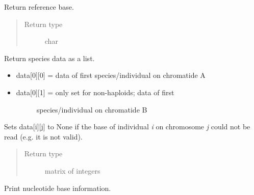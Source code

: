 \documentclass[letterpaper,10pt,english]{sphinxmanual}
\begin{document}
\begin{fulllineitems}
\begin{fulllineitems}
\label{vcf:libPoMo.vcf.NucBase.get_ref_base}
Return reference base.
\begin{quote}\begin{description}
\item[{Return type}] \leavevmode
char

\end{description}\end{quote}

\end{fulllineitems}


\begin{fulllineitems}
\label{vcf:libPoMo.vcf.NucBase.get_speciesData}
Return species data as a list.
\begin{itemize}
\item {} 
data{[}0{]}{[}0{]} = data of first species/individual on chromatide A

\item {} \begin{description}
\item[{data{[}0{]}{[}1{]} = only set for non-haploids; data of first}] \leavevmode
species/individual on chromatide B

\end{description}

\end{itemize}

Sets data{[}i{]}{[}j{]} to None if the base of individual \emph{i} on
chromosome \emph{j} could not be read (e.g. it is not valid).
\begin{quote}\begin{description}
\item[{Return type}] \leavevmode
matrix of integers

\end{description}\end{quote}

\end{fulllineitems}


\begin{fulllineitems}
\label{vcf:libPoMo.vcf.NucBase.print_info}
Print nucleotide base information.


\end{fulllineitems}
\end{fulllineitems}
\end{document}
